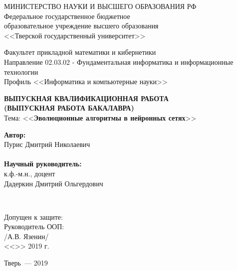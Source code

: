 \begin{titlepage}
  \begin{center}
  \begin{center} {МИНИСТЕРСТВО НАУКИ И ВЫСШЕГО ОБРАЗОВАНИЯ РФ\\
  Федеральное государственное бюджетное \\ образовательное учреждение высшего образования\\
  <<Тверской государственный университет>>}
  \end{center}
  \vspace{0em} \begin{center} {Факультет прикладной математики и кибернетики\\
  Направление 02.03.02 - Фундаментальная информатика и информационные технологии \\
  Профиль <<Информатика и компьютерные науки>>}
  \end{center}
  \vspace{2em}
  \textbf{ВЫПУСКНАЯ КВАЛИФИКАЦИОННАЯ РАБОТА \\
  (ВЫПУСКНАЯ РАБОТА БАКАЛАВРА)}\\
  Тема: <<\textbf{Эволюционные алгоритмы в нейронных сетях}>> \\
  \vspace{3em}
  \hfill\parbox{7.3cm}{
  \textbf{Автор:}\\
  Пурис Дмитрий Николаевич \\ \\
  \textbf{Научный руководитель:}\\
  к.ф.-м.н., доцент\\Дадеркин Дмитрий Ольгердович\\
  }
  \vspace{4em} \\
  \raggedright
  Допущен к защите:\\
  Руководитель ООП:\\
  \underline{\hspace{4cm}} /А.В. Язенин/ \\
  <<\underline{\hspace{1cm}}>>\underline{\hspace{3.5cm}} 2019 г. \\
  \hfill \break
  \hfill \break
  \hfill \break
  \begin{center} Тверь~--- 2019\end{center}
  \end{center}
  \end{titlepage}
 \setcounter{page}{2}